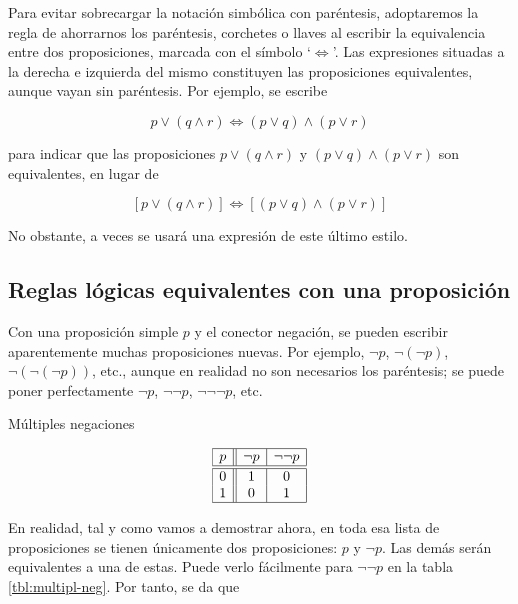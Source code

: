 



Para evitar sobrecargar la notación simbólica con paréntesis, adoptaremos la
regla de ahorrarnos los paréntesis, corchetes o llaves al escribir la
equivalencia entre dos proposiciones, marcada con el símbolo
`$\Longleftrightarrow$'. Las expresiones situadas a la derecha e izquierda
del mismo constituyen las proposiciones equivalentes, aunque vayan sin
paréntesis. Por ejemplo, se escribe

$$ p \lor (q \land r) \iff (p \lor q) \land (p \lor r) $$

\noindent para indicar que las proposiciones $p \lor (q \land r)$ y \( (p
\lor q) \land (p \lor r) \) son equivalentes, en lugar de

$$ [p \lor (q \land r)] \iff [(p \lor q) \land (p \lor r)] $$

\noindent No obstante, a veces se usará una expresión de este último estilo.






\subsection{Reglas lógicas equivalentes con una proposición}

Con una proposición simple $p$ y el conector negación, se pueden escribir
aparentemente muchas proposiciones nuevas. Por ejemplo, $\neg p$, $\neg(\neg
p)$, $\neg(\neg(\neg p))$, etc., aunque en realidad no son necesarios los
paréntesis; se puede poner perfectamente $\neg p$, $\neg \neg p$, $\neg \neg
\neg p$, etc.

\begin{table}[h]%
  \caption{Múltiples negaciones}
  \label{tbl:multipl-neg}%
  \centering
  $$
    \begin{array}{|c||c|c|}
      \hline
      p & \neg p & \neg \neg p \\
      \hline
      \hline
      0 & 1 & 0 \\
      1 & 0 & 1 \\
      \hline
    \end{array}
  $$
\end{table}

En realidad, tal y como vamos a demostrar ahora, en toda esa lista de
proposiciones se tienen únicamente dos proposiciones: $p$ y $\neg p$. Las
demás serán equivalentes a una de estas. Puede verlo fácilmente para $\neg
\neg p$ en la tabla \ref{tbl:multipl-neg}. Por tanto, se da que

